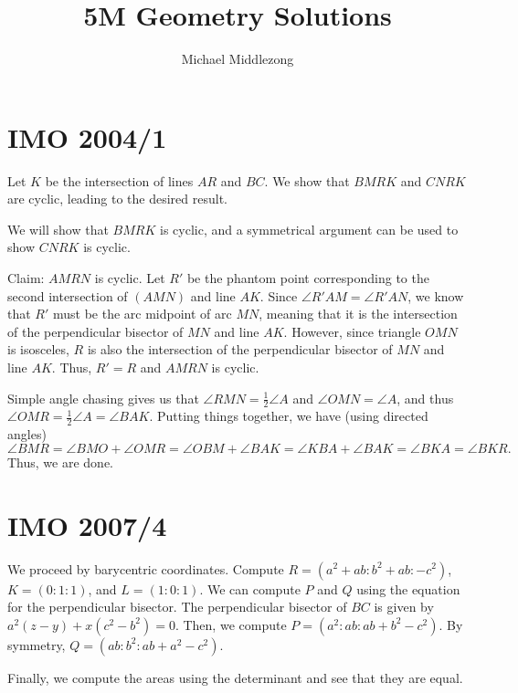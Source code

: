 \documentclass{scrartcl}
\title{5M Geometry Solutions}
\author{Michael Middlezong}
\begin{document}
\maketitle

\section*{IMO 2004/1}
Let $K$ be the intersection of lines $AR$ and $BC$. We show that $BMRK$ and $CNRK$ are cyclic, leading to the desired result.

We will show that $BMRK$ is cyclic, and a symmetrical argument can be used to show $CNRK$ is cyclic.

Claim: $AMRN$ is cyclic. Let $R'$ be the phantom point corresponding to the second intersection of $(AMN)$ and line
$AK$. Since $\angle R'AM = \angle R'AN$, we know that $R'$ must be the arc midpoint of arc $MN$, meaning that it is
the intersection of the perpendicular bisector of $MN$ and line $AK$. However, since triangle $OMN$ is isosceles,
$R$ is also the intersection of the perpendicular bisector of $MN$ and line $AK$. Thus, $R' = R$ and $AMRN$ is
cyclic.

Simple angle chasing gives us that $\angle RMN = \frac12 \angle A$ and $\angle OMN = \angle A$, and thus $\angle OMR = \frac12 \angle A = \angle BAK$. Putting things
together, we have (using directed angles)
\[ \angle BMR = \angle BMO + \angle OMR = \angle OBM + \angle BAK = \angle KBA + \angle BAK = \angle BKA = \angle BKR. \]
Thus, we are done.

\section*{IMO 2007/4}
We proceed by barycentric coordinates. Compute $R = (a^2 + ab : b^2 + ab : -c^2)$, $K = (0:1:1)$, and $L = (1:0:1)$.
We can compute $P$ and $Q$ using the equation for the perpendicular bisector. The perpendicular bisector of $BC$
is given by $a^2(z-y) + x(c^2 - b^2) = 0$. Then, we compute $P = (a^2:ab:ab+b^2-c^2)$. By symmetry, $Q = (ab : b^2 : ab + a^2 - c^2)$.

Finally, we compute the areas using the determinant and see that they are equal.
\end{document}
